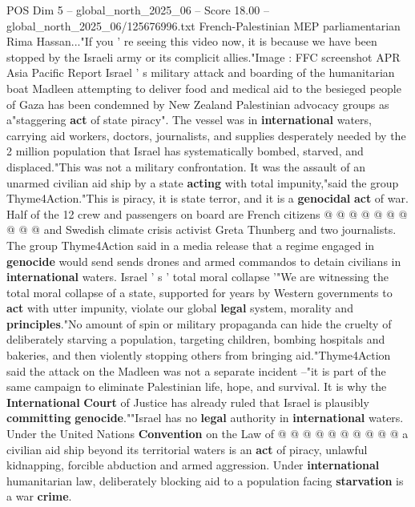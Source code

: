 \begin{textsample}{POS Dim 5 – global\_north\_2025\_06 – Score 18.00 – global\_north\_2025\_06/125676996.txt}  \label{ex:f5_pos_068}
French-Palestinian MEP parliamentarian Rima Hassan..."If you ' re seeing this video now, it is because we have been stopped by the Israeli army or its complicit allies."Image : FFC screenshot APR Asia Pacific Report Israel ' s military attack and boarding of the humanitarian boat Madleen attempting to deliver food and medical aid to the besieged people of Gaza has been condemned by New Zealand Palestinian advocacy groups as a"staggering \textbf{act} of state piracy".
The vessel was in \textbf{international} waters, carrying aid workers, doctors, journalists, and supplies desperately needed by the 2 million population that Israel has systematically bombed, starved, and displaced."This was not a military confrontation.
It was the assault of an unarmed civilian aid ship by a state \textbf{acting} with total impunity,"said the group Thyme4Action."This is piracy, it is state terror, and it is a \textbf{genocidal} \textbf{act} of war.
Half of the 12 crew and passengers on board are French citizens @ @ @ @ @ @ @ @ @ @ and Swedish climate crisis activist Greta Thunberg and two journalists.
The group Thyme4Action said in a media release that a regime engaged in \textbf{genocide} would send sends drones and armed commandos to detain civilians in \textbf{international} waters.
Israel ' s ' total moral collapse '"We are witnessing the total moral collapse of a state, supported for years by Western governments to \textbf{act} with utter impunity, violate our global \textbf{legal} system, morality and \textbf{principles}."No amount of spin or military propaganda can hide the cruelty of deliberately starving a population, targeting children, bombing hospitals and bakeries, and then violently stopping others from bringing aid."Thyme4Action said the attack on the Madleen was not a separate incident --"it is part of the same campaign to eliminate Palestinian life, hope, and survival.
It is why the \textbf{International} \textbf{Court} of Justice has already ruled that Israel is plausibly \textbf{committing} \textbf{genocide}.""Israel has no \textbf{legal} authority in \textbf{international} waters.
Under the United Nations \textbf{Convention} on the Law of @ @ @ @ @ @ @ @ @ @ a civilian aid ship beyond its territorial waters is an \textbf{act} of piracy, unlawful kidnapping, forcible abduction and armed aggression.
Under \textbf{international} humanitarian law, deliberately blocking aid to a population facing \textbf{starvation} is a war \textbf{crime}.

\end{textsample}
